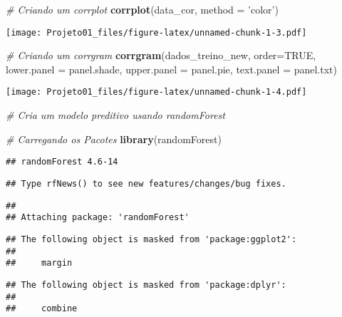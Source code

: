 \documentclass[]{article}
\newenvironment{Shaded}{\begin{snugshade}}{\end{snugshade}}
\newcommand{\CommentTok}[1]{\textcolor[rgb]{0.56,0.35,0.01}{\textit{#1}}}
\newcommand{\DataTypeTok}[1]{\textcolor[rgb]{0.13,0.29,0.53}{#1}}
\newcommand{\KeywordTok}[1]{\textcolor[rgb]{0.13,0.29,0.53}{\textbf{#1}}}
\newcommand{\NormalTok}[1]{#1}
\newcommand{\OtherTok}[1]{\textcolor[rgb]{0.56,0.35,0.01}{#1}}
\newcommand{\StringTok}[1]{\textcolor[rgb]{0.31,0.60,0.02}{#1}}
\begin{document}
\begin{Shaded}
\begin{Highlighting}[]
\CommentTok{# Criando um corrplot}
\KeywordTok{corrplot}\NormalTok{(data_cor, }\DataTypeTok{method =} \StringTok{'color'}\NormalTok{)}
\end{Highlighting}
\end{Shaded}

\texttt{[image: Projeto01\_files/figure-latex/unnamed-chunk-1-3.pdf]}

\begin{Shaded}
\begin{Highlighting}[]
\CommentTok{# Criando um corrgram}
\KeywordTok{corrgram}\NormalTok{(dados_treino_new, }\DataTypeTok{order=}\OtherTok{TRUE}\NormalTok{, }\DataTypeTok{lower.panel =}\NormalTok{ panel.shade,}
         \DataTypeTok{upper.panel =}\NormalTok{ panel.pie, }\DataTypeTok{text.panel =}\NormalTok{ panel.txt)}
\end{Highlighting}
\end{Shaded}

\texttt{[image: Projeto01\_files/figure-latex/unnamed-chunk-1-4.pdf]}

\begin{Shaded}
\begin{Highlighting}[]
\CommentTok{# Cria um modelo preditivo usando randomForest}

\CommentTok{# Carregando os Pacotes}
\KeywordTok{library}\NormalTok{(randomForest)}
\end{Highlighting}
\end{Shaded}

\begin{verbatim}
## randomForest 4.6-14
\end{verbatim}

\begin{verbatim}
## Type rfNews() to see new features/changes/bug fixes.
\end{verbatim}

\begin{verbatim}
## 
## Attaching package: 'randomForest'
\end{verbatim}

\begin{verbatim}
## The following object is masked from 'package:ggplot2':
## 
##     margin
\end{verbatim}

\begin{verbatim}
## The following object is masked from 'package:dplyr':
## 
##     combine
\end{verbatim}
\end{document}
